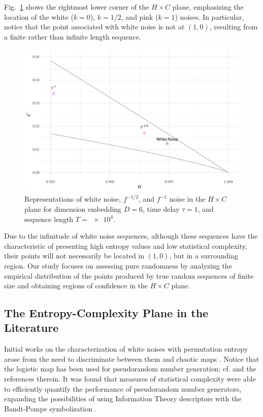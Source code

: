 \documentclass[alpha-refs]{wiley-article}
\begin{document}
Fig.~\ref{fig:RightMostCorner} shows the rightmost lower corner of the $H\times C$ plane, emphasizing the location of the white ($k=0$), $k=1/2$, and pink ($k=1$) noises.
In particular, notice that the point associated with white noise is not at $(1,0)$, resulting from a finite rather than infinite length sequence.

\begin{figure}[hbt]
\centering
\includegraphics[width=\linewidth]{RightMostCorner}
\caption{Representations of white noise, $f^{-1/2}$, and $f^{-1}$ noise in the $H \times C$ plane  for dimension embedding $D = 6$, time delay $\tau = 1$, and sequence length $T = \num[scientific-notation=true]{e4}$.}
\label{fig:RightMostCorner}
\end{figure}

Due to the infinitude of white noise sequences, although these sequences have the characteristic of presenting high entropy values and low statistical complexity, their points will not necessarily be located in $(1, 0)$, but in a surrounding region.
Our study focuses on assessing pure randomness by analyzing the empirical distribution of the points produced by true random sequences of finite size and obtaining regions of confidence in the $H \times C$ plane.

\subsection{The Entropy-Complexity Plane in the Literature}\label{Sec:BPApplications}

Initial works on the characterization of white noises with permutation entropy arose from the need to discriminate between them and chaotic maps \citep{rosso2013characterization, xiong2020complexity}.
Notice that the logistic map has been used for pseudorandom number generation; cf. \citet{AnalyzingLogisticMapPseudorandomNumberGeneratorsforPeriodicityInducedbyFinitePrecisionFloatingPointRepresentation} and the references therein.
It was found that measures of statistical complexity were able to efficiently quantify the performance of pseudorandom number generators, expanding the possibilities of using Information Theory descriptors with the Bandt-Pompe symbolization \citep{larrondo2013statistical, gonzalez2005statistical}.
\end{document}
